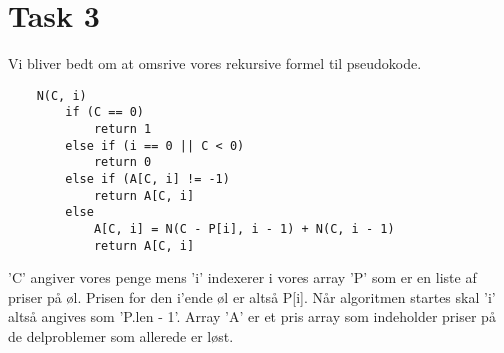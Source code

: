 \section{Task 3}
Vi bliver bedt om at omsrive vores rekursive formel til pseudokode.
\begin{lstlisting}
	N(C, i)
		if (C == 0)
			return 1
		else if (i == 0 || C < 0)
			return 0
		else if (A[C, i] != -1)
			return A[C, i]
		else
			A[C, i] = N(C - P[i], i - 1) + N(C, i - 1)
			return A[C, i]
\end{lstlisting}
'C' angiver vores penge mens 'i' indexerer i vores array 'P' som er en liste af priser på øl. Prisen for den i'ende øl er altså P[i]. Når algoritmen startes skal 'i' altså angives som 'P.len - 1'. Array 'A' er et pris array som indeholder priser på de delproblemer som allerede er løst.


